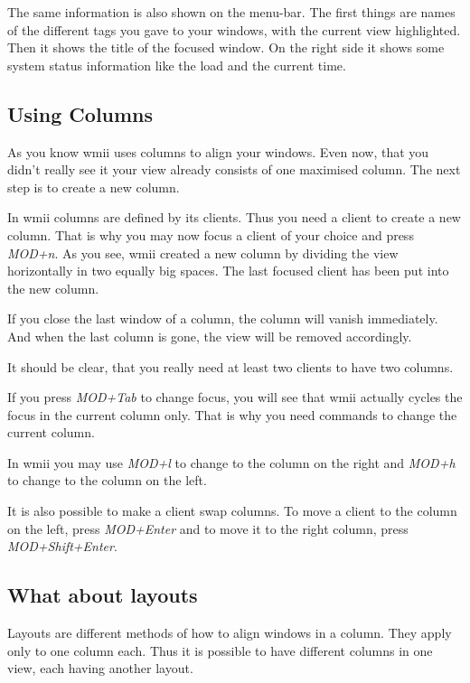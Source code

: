 \documentclass[12pt,a4paper]{article}
\begin{document}
    The same information is also shown on the menu-bar. The first
    things are names of the different tags you gave to your windows,
    with the current view highlighted. Then it shows the title of the
    focused window. On the right side it shows some system status
    information like the load and the current time.

  \subsection{Using Columns}

    As you know wmii uses columns to align your windows. Even now,
    that you didn't really see it your view already consists of one
    maximised column. The next step is to create a new column.

    In wmii columns are defined by its clients. Thus you need a client
    to create a new column. That is why you may now focus a client of
    your choice and press \emph{MOD+n}. As you see, wmii created a new
    column by dividing the view horizontally in two equally big
    spaces. The last focused client has been put into the new column.

    If you close the last window of a column, the column will vanish
    immediately. And when the last column is gone, the view will be
    removed accordingly.

    It should be clear, that you really need at least two clients to
    have two columns.

    If you press \emph{MOD+Tab} to change focus, you will see that
    wmii actually cycles the focus in the current column only. That is
    why you need commands to change the current column.

    In wmii you may use \emph{MOD+l} to change to the column on the
    right and \emph{MOD+h} to change to the column on the left.

    It is also possible to make a client swap columns. To move a
    client to the column on the left, press \emph{MOD+Enter} and to
    move it to the right column, press \emph{MOD+Shift+Enter}.

  \subsection{What about layouts}

    Layouts are different methods of how to align windows in a
    column. They apply only to one column each. Thus it is possible to
    have different columns in one view, each having another layout.
\end{document}
